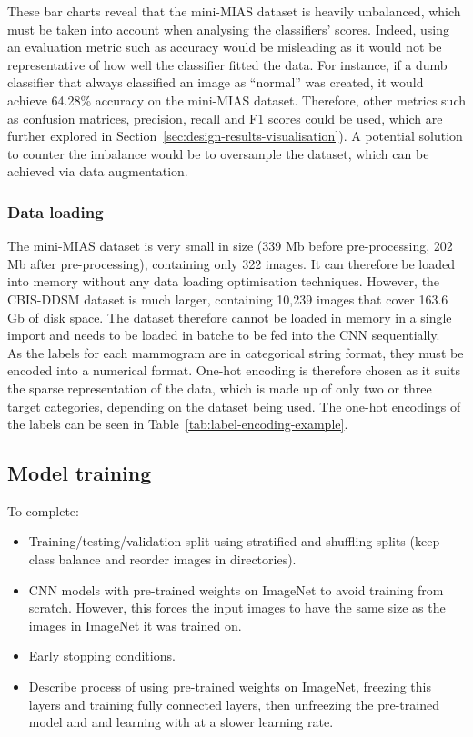 These bar charts reveal that the mini-MIAS dataset is heavily unbalanced, which must be taken into account when analysing the classifiers' scores. Indeed, using an  evaluation metric such as accuracy would be misleading as it would not be representative of how well the classifier fitted the data. For instance, if a dumb classifier that always classified an image as ``normal'' was created, it would achieve 64.28\% accuracy on the mini-MIAS dataset. Therefore, other metrics such as confusion matrices, precision, recall and F1 scores could be used, which are further explored in Section~\ref{sec:design-results-visualisation}). A potential solution to counter the imbalance would be to oversample the dataset, which can be achieved via data augmentation.

\subsubsection{Data loading}

The mini-MIAS dataset is very small in size (339 Mb before pre-processing, 202 Mb after pre-processing), containing only 322 images. It can therefore be loaded into memory without any data loading optimisation techniques. However, the CBIS-DDSM dataset is much larger, containing 10,239 images that cover 163.6 Gb of disk space. The dataset therefore cannot be loaded in memory in a single import and needs to be loaded in batche to be fed into the CNN sequentially.\\ %

As the labels for each mammogram are in categorical string format, they must be encoded into a numerical format. One-hot encoding is therefore chosen as it suits the sparse representation of the data, which is made up of only two or three target categories, depending on the dataset being used. The one-hot encodings of the labels can be seen in Table~\ref{tab:label-encoding-example}.




\subsection{Model training}

To complete:
\begin{itemize}
    \item Training/testing/validation split using stratified and shuffling splits (keep class balance and reorder images in directories).
    \item CNN models with pre-trained weights on ImageNet to avoid training from scratch. However, this  forces the input images to have the same size as the images in ImageNet it was trained on.
    \item Early stopping conditions.
    \item Describe process of using pre-trained weights on ImageNet, freezing this layers and training fully connected layers, then unfreezing the pre-trained model and and learning with at a slower learning rate.
\end{itemize}

